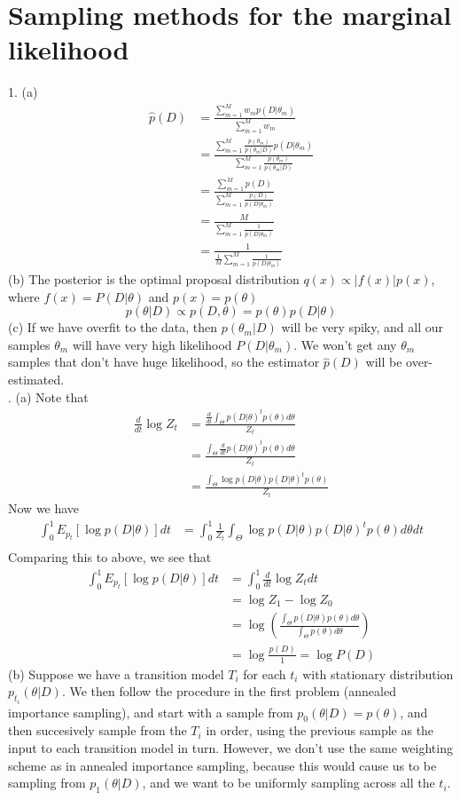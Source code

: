 \documentclass[11pt]{article}
\begin{document}
\newpage
\section{Sampling methods for the marginal likelihood}
1.  (a) 
\begin{align*}
  \hat{p}(D) &= \frac{\sum_{m = 1}^M w_m p(D | \theta_m ) }{\sum_{m = 1}^M w_m} \\
  &= \frac{\sum_{m=1}^M \frac{p(\theta_m)}{p(\theta_m | D)} p(D | \theta_m) }{\sum_{m=1}^M \frac{p(\theta_m)}{p(\theta_m | D)}}\\
  &= \frac{\sum_{m=1}^M p(D)}{\sum_{m=1}^M \frac{p(D)}{p(D | \theta_m)}}\\
  &= \frac{M}{\sum_{m=1}^M \frac{1}{p(D | \theta_m)}}\\
  &= \frac{1}{\frac{1}{M} \sum_{m=1}^M \frac{1}{p(D | \theta_m)}}
\end{align*}
(b) The posterior is the optimal proposal distribution $q(x) \propto |f(x)|p(x)$, where $f(x) = P(D | \theta)$ and $p(x) = p(\theta)$
\[p(\theta | D) \propto p(D,\theta) =  p(\theta) p(D | \theta)\]
\noindent (c) If we have overfit to the data, then $p(\theta_m | D)$ will be very spiky, and all our samples $\theta_m$ will have very high likelihood $P(D | \theta_m)$. We won't get any $\theta_m$ samples that don't have huge likelihood, so the estimator $\hat{p}(D)$ will be over-estimated.\\
.  (a) Note that
\begin{align*}
  \frac{d}{dt} \log Z_t &= \frac{\frac{d}{dt} \int_{\Theta} p(D | \theta)^t p(\theta) d\theta }{Z_t}\\
  &= \frac{\int_{\Theta} \frac{d}{dt} p(D | \theta)^t  p(\theta) d \theta}{Z_t}\\
  &= \frac{\int_{\Theta} \log p(D|\theta) p(D | \theta)^t p(\theta)}{Z_t}
\end{align*}
Now we have
\begin{align*}
  \int_0^1 E_{p_t}[\log p(D | \theta)] dt &= \int_0^1  \frac{1}{Z_t} \int_{\Theta}\log p(D|\theta) p(D | \theta)^t p(\theta)  d\theta dt \\
\end{align*}
Comparing this to above, we see that
\begin{align*}
  \int_0^1 E_{p_t}[\log p(D | \theta)] dt &= \int_0^1 \frac{d}{dt} \log Z_t dt\\
  &= \log Z_1 - \log Z_0\\
  &= \log \left(  \frac{\int_{\Theta} p(D | \theta) p(\theta) d \theta  }{\int_{\Theta} p(\theta) d\theta} \right)\\
  &= \log \frac{p(D)}{1} = \log P(D)
\end{align*}
(b) Suppose we have a transition model $T_i$ for each $t_i$ with stationary distribution $p_{t_i}(\theta | D)$. We then follow the procedure in the first problem (annealed importance sampling), and start with a sample from $p_0(\theta | D) = p(\theta)$, and then succesively sample from the $T_i$ in order, using the previous sample as the input to each transition model in turn. However, we don't use the same weighting scheme as in annealed importance sampling, because this would cause us to be sampling from $p_1(\theta | D)$, and we want to be uniformly sampling across all the $t_i$.
\end{document}
